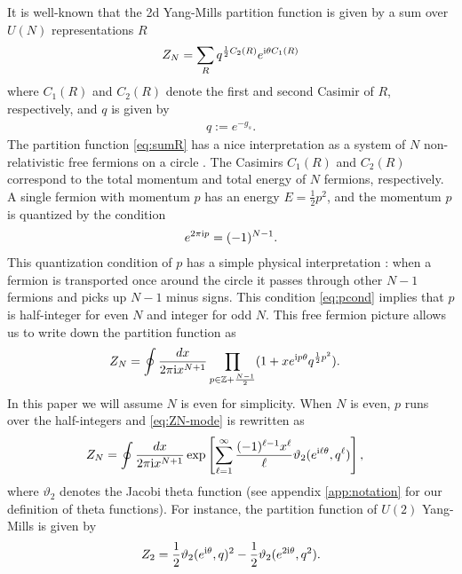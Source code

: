 \documentclass[11pt]{article}
\newcommand{\ri}{{\rm i}}
\def\th{\theta}
\newcommand{\hf}{\frac{1}{2}}
\renewcommand{\[}{\begin{eqnarray}}
\renewcommand{\]}{\end{eqnarray}}
\begin{document}
It is well-known that the 2d Yang-Mills partition function is given by
a sum over $U(N)$ representations $R$ \cite{Migdal:1975zg,Rusakov:1990rs}
\begin{align}
 Z_N=\sum_R q^{\hf C_2(R)}e^{\ri \th C_1(R)}
\label{eq:sumR}
\end{align}
where $C_1(R)$ and $C_2(R)$ denote the first and second Casimir of $R$, respectively, 
and $q$ is 
given by
\begin{align}
 q:=e^{-g_s}.
\end{align}
The partition function \eqref{eq:sumR} has a nice interpretation as a system of $N$
non-relativistic free fermions on a circle \cite{Minahan:1993np}.
The Casimirs $C_1(R)$ and $C_2(R)$ correspond to the total momentum and total
energy of $N$ fermions, respectively.
A single fermion with momentum $p$ has an 
energy
$E=\frac{1}{2}p^2$, 
and the momentum $p$ is quantized by the condition
\begin{align}
 e^{2\pi\ri p}=(-1)^{N-1}.
\label{eq:pcond}
\end{align}
This quantization condition of $p$
has a simple physical interpretation \cite{Minahan:1993np}: when a fermion is transported once around the circle
it passes through other $N-1$ fermions and picks up $N-1$ minus signs. 
This condition \eqref{eq:pcond}
implies that $p$ is half-integer for even $N$ and integer for odd $N$.
This free fermion picture allows us to write down the partition function
as
\begin{align}
\begin{aligned}
 Z_N&=\oint\frac{dx}{2\pi\ri x^{N+1}}
\prod_{p\in\mathbb{Z}+\frac{N-1}{2} }(1+xe^{\ri p\th}q^{\hf p^2}).
\end{aligned}
\label{eq:ZN-mode}
\end{align}
In this paper we will assume $N$ is even
for simplicity.
When $N$ is even, $p$ runs over the half-integers and 
\eqref{eq:ZN-mode} is rewritten as
\begin{equation}
\begin{aligned}
 Z_N&=\oint\frac{dx}{2\pi\ri x^{N+1}}\exp\left[\sum_{\ell=1}^\infty
\frac{(-1)^{\ell-1}x^\ell}{\ell}\vartheta_2(e^{\ri\ell\th},q^\ell)\right] ,
\end{aligned} 
\label{eq:ZN-int-th}
\end{equation}
where $\vartheta_2$ denotes the Jacobi theta function (see appendix \ref{app:notation} for
our definition of theta functions).
For instance, the partition function of $U(2)$ Yang-Mills is given by
\begin{align}
 Z_2=\hf \vartheta_2(e^{\ri\th},q)^2-\hf \vartheta_2(e^{2\ri\th},q^2).
\label{eq:Z2}
\end{align} 
\end{document}
